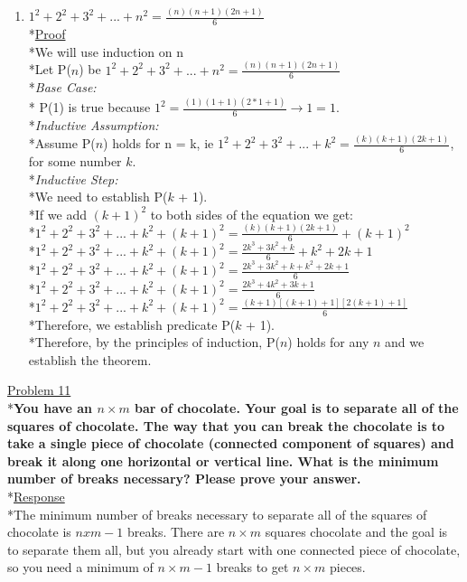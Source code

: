 \documentclass[12pt]{article}
\begin{document}
\begin{enumerate}
	
	
	\item \textbf{$1^2+2^2+3^2+...+n^2=\frac{(n)(n+1)(2n+1)}{6}$}
	\medskip
	\\*\uline{Proof}
	\medskip
	\\*We will use induction on n
	\bigskip
	\\*Let P($n$) be $1^2 + 2^2 + 3^2 + ... + n^2 = \frac{(n)(n+1)(2n+1)}{6}$
	\bigskip
	\\*\textit{Base Case:}
	\\* P(1) is true because $1^2 = \frac{(1)(1+1)(2*1+1)}{6} \rightarrow 1 = 1$.
	\bigskip
	\\*\textit{Inductive Assumption:}
	\\*Assume P($n$) holds for n = k, ie $1^2 + 2^2 + 3^2 + ... + k^2 = \frac{(k)(k+1)(2k+1)}{6}$, for some number $k$. 
	\\*\textit{Inductive Step:}
	\\*We need to establish P($k$ + 1).
	\\*If we add $(k+1)^2$ to both sides of the equation we get:
	\\*$1^2 + 2^2 + 3^2 + ... + k^2 + (k+1)^2 = \frac{(k)(k+1)(2k+1)}{6} + (k+1)^2$
	\\*$1^2 + 2^2 + 3^2 + ... + k^2 + (k+1)^2 = \frac{2k^3 + 3k^2 + k}{6} + k^2 + 2k + 1$
	\\*$1^2 + 2^2 + 3^2 + ... + k^2 + (k+1)^2 = \frac{2k^3 + 3k^2 + k + k^2 + 2k + 1}{6}$
	\\*$1^2 + 2^2 + 3^2 + ... + k^2 + (k+1)^2 = \frac{2k^3 + 4k^2 + 3k + 1}{6}$
	\\*$1^2 + 2^2 + 3^2 + ... + k^2 + (k+1)^2 = \frac{(k+1)[(k+1) + 1][2(k+1) + 1]}{6}$
	\\*Therefore, we establish predicate P($k$ + 1).
	\bigskip
	\\*Therefore, by the principles of induction, P($n$) holds for any $n$ and we establish the theorem. 
\end{enumerate}
\bigskip



\noindent
\uline{Problem 11}
\\*\textbf{You have an $n\times m$ bar of chocolate. Your goal is to separate all of the squares of chocolate. The way that you can break the chocolate is to take a single piece of chocolate (connected component of squares) and break it along one horizontal  or vertical line. What is the minimum number of breaks necessary? Please prove your answer. }
\smallskip
\\*\uline{Response}
\\*The minimum number of breaks necessary to separate all of the squares of chocolate is $n x m - 1$ breaks. There are $n \times m$ squares chocolate and the goal is to separate them all, but you already start with one connected piece of chocolate, so you need a minimum of $n \times m - 1$ breaks to get $n \times m$ pieces.
\bigskip
\end{document}
